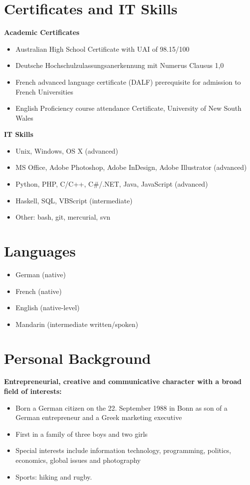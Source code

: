 \documentclass[margin]{res}
\begin{document}
\begin{resume}
\section{Certificates and IT Skills}
  {\bf Academic Certificates}
  \begin{itemize} \itemsep -0.5pt 
  \item Australian High School Certificate with UAI of 98.15/100
  \item Deutsche Hochschulzulassungsanerkennung mit Numerus Clausus 1,0
  \item French advanced language certificate (DALF) prerequisite for admission to French Universities
  \item English Proficiency course attendance Certificate, University of New South Wales
  \end{itemize}
  {\bf IT Skills}
  \begin{itemize} \itemsep -0.5pt 
  \item Unix, Windows, OS X (advanced)
  \item MS Office, Adobe Photoshop, Adobe InDesign, Adobe Illustrator (advanced)
  \item Python, PHP, C/C++, C\#/.NET, Java, JavaScript (advanced)
  \item Haskell, SQL, VBScript (intermediate)
  \item Other: bash, git, mercurial, svn
  \end{itemize}

\section{Languages}
  \begin{itemize} \itemsep -0.5pt 
  \item German (native)
  \item French (native)
  \item English (native-level)
  \item Mandarin (intermediate written/spoken)
  \end{itemize}

\section{Personal Background}
{\bf Entrepreneurial, creative and communicative character with a broad field of interests:}
  \begin{itemize} \itemsep -0.5pt 
  \item Born a German citizen on the 22. September 1988 in Bonn as son of a German entrepreneur and a Greek marketing executive
  \item First in a family of three boys and two girls
  \item Special interests include information technology, programming, politics, economics, global issues and photography
  \item Sports: hiking and rugby.
  \end{itemize}


\end{resume}
\end{document}

